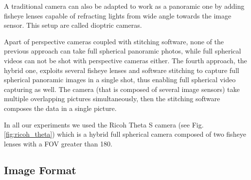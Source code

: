 A traditional camera can also be adapted to work as a panoramic one by adding
fisheye lenses capable of refracting lights from wide angle towards the 
image sensor. This setup are called dioptric cameras.

Apart of perspective cameras coupled with stitching software, none of the 
previous approach can take full spherical panoramic photos, while full spherical 
videos can not be shot with perspective cameras either.
The fourth approach, the hybrid one, exploits several fisheye lenses and 
software stitching to capture full spherical panoramic images in a single shot, 
thus enabling full spherical video capturing as well.
The camera (that is composed of several image sensors) take multiple 
overlapping pictures simultaneously, then the stitching software composes the
data in a single picture.

In all our experiments we used the Ricoh Theta S camera 
(see Fig. \ref{fig:ricoh_theta}) which is a hybrid full spherical camera composed 
of two fisheye lenses with a FOV greater than 180\degree.
\label{fig:ricoh_theta}

\subsection{Image Format}


